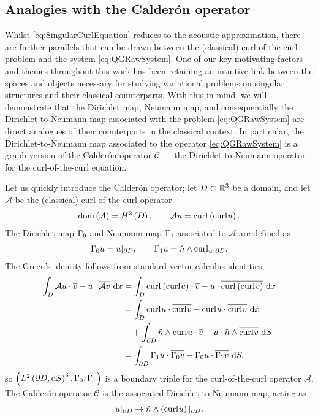 \subsection{Analogies with the Calder\'on operator} \label{ssec:CalderonOp}
Whilst \eqref{eq:SingularCurlEquation} reduces to the acoustic approximation, there are further parallels that can be drawn between the (classical) curl-of-the-curl problem and the system \eqref{eq:QGRawSystem}.
One of our key motivating factors and themes throughout this work has been retaining an intuitive link between the spaces and objects necessary for studying variational problems on singular structures and their classical counterparts.
With this in mind, we will demonstrate that the Dirichlet map, Neumann map, and consequentially the Dirichlet-to-Neumann map associated with the problem \eqref{eq:QGRawSystem} are direct analogues of their counterparts in the classical context.
In particular, the Dirichlet-to-Neumann map associated to the operator \eqref{eq:QGRawSystem} is a graph-version of the Calder\'{o}n operator $\mathcal{C}$ --- the Dirichlet-to-Neumann operator for the curl-of-the-curl equation.

Let us quickly introduce the Calder\'{o}n operator; let $D\subset\mathbb{R}^3$ be a domain, and let $\mathcal{A}$ be the (classical) curl of the curl operator
\begin{align*}
	\mathrm{dom}\left( \mathcal{A} \right) = H^2\left( D \right), \qquad
	\mathcal{A}u = \mathrm{curl}_{}\left( \mathrm{curl}_{}u \right).
\end{align*}
The Dirichlet map $\Gamma_0$ and Neumann map $\Gamma_1$ associated to $\mathcal{A}$ are defined as
\begin{align} \label{eq:ClassicalEM-DNMaps}
	\Gamma_0 u = u\vert_{\partial D}, \qquad
	\Gamma_1 u = \hat{n}\wedge\mathrm{curl}_{u}\vert_{\partial D}.
\end{align}
The Green's identity follows from standard vector calculus identities;
\begin{align*}
	\int_{D} \mathcal{A}u \cdot \overline{v} - u \cdot \overline{\mathcal{A}v}  \ \mathrm{d}x
	&= \int_{D} \mathrm{curl}_{}\left( \mathrm{curl}_{}u \right)\cdot\overline{v} - u\cdot\overline{\mathrm{curl}_{}\left( \mathrm{curl}_{}v \right)}  \ \mathrm{d}x \\
	&= \int_{D} \mathrm{curl}_{}u\cdot\overline{\mathrm{curl}_{}v} - \mathrm{curl}_{}u\cdot\overline{\mathrm{curl}_{}v}  \ \mathrm{d}x \\
	&\quad + \int_{\partial D} \hat{n}\wedge\mathrm{curl}_{}u\cdot\overline{v} - u\cdot\hat{n}\wedge\overline{\mathrm{curl}_{}v}  \ \mathrm{d}S \\
	&= \int_{\partial D} \Gamma_1 u \cdot \overline{\Gamma_0 v} - \Gamma_0 u \cdot \overline{\Gamma_1 v}  \ \mathrm{d}S,
\end{align*}
so $\left( L^{2}\left( \partial D,\mathrm{d} S \right)^3, \Gamma_0, \Gamma_1 \right)$ is a boundary triple for the curl-of-the-curl operator $\mathcal{A}$.
The Calder\'{o}n operator $\mathcal{C}$ is the associated Dirichlet-to-Neumann map, acting as
\begin{align*}
	u\vert_{\partial D} \rightarrow \hat{n}\wedge\left( \mathrm{curl}_{}u \right)\vert_{\partial D}.
\end{align*}

